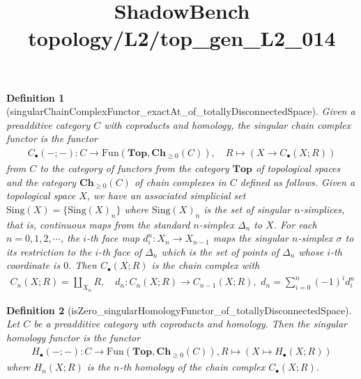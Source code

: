 \documentclass{article}
\title{ShadowBench topology/L2/top\_gen\_L2\_014}
\newtheorem{definition}{Definition}
\begin{document}
\maketitle

\begin{definition}[singularChainComplexFunctor_exactAt_of_totallyDisconnectedSpace]
    Given a preadditive category $C$ with coproducts and homology, the singular chain complex functor is the functor
    \begin{align*}
        C_\bullet(-;-): C \to \text{Fun}(\textbf{Top}, \textbf{Ch}_{\ge 0}(C)),\quad R \mapsto (X \to C_\bullet(X;R))
    \end{align*}
    from $C$ to the category of functors from the category $\textbf{Top}$ of topological spaces and the category $\textbf{Ch}_{\ge 0}(C)$ of chain complexes in $C$ defined as follows. Given a topological space $X$, we have an associated simplicial set $\text{Sing}(X) = \{\text{Sing}(X)_n\}$ where $\text{Sing}(X)_n$ is the set of singular $n$-simplices, that is, continuous maps from the standard $n$-simplex $\Delta_n$ to $X$. For each $n =0,1,2,\cdots$, the $i$-th face map $d_i^n:X_n \to X_{n-1}$ maps the singular $n$-simplex $\sigma$ to its restriction to the $i$-th face of $\Delta_n$ which is the set of points of $\Delta_n$ whose $i$-th coordinate is $0$. Then $C_\bullet(X;R)$ is the chain complex with
    \begin{align*}
        C_n(X;R) = \coprod_{X_n} R, \quad d_n:C_n(X;R) \to C_{n-1}(X;R),\,\, d_n = \sum_{i=0}^n (-1)^i d_i^n
    \end{align*}
\end{definition}

\begin{definition}[isZero_singularHomologyFunctor_of_totallyDisconnectedSpace]
    Let $C$ be a preadditive category wth coproducts and homology. Then the singular homology functor is the functor
    \begin{align*}
        H_\bullet(-;-):C \to \text{Fun}(\textbf{Top},\textbf{Ch}_{\ge 0}(C)), R \mapsto (X \mapsto H_\bullet(X;R))
    \end{align*}
    where $H_n(X;R)$ is the $n$-th homology of the chain complex $C_\bullet(X;R)$.
\end{definition}
\end{document}
